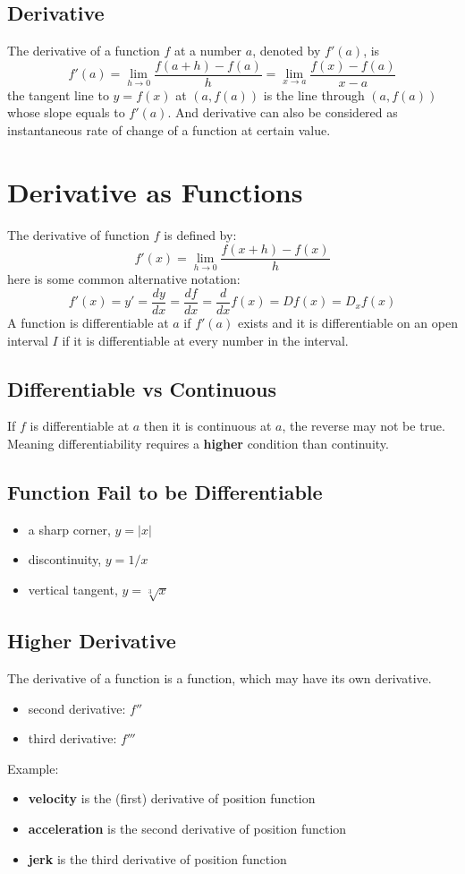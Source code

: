 \documentclass[10pt,a4paper,oneside]{article}
\begin{document}
\subsection{Derivative}
The derivative of a function $f$ at a number $a$, denoted by $f'(a)$, is
\[
f'(a) = \lim_{h \rightarrow 0} \frac{f(a+h) - f(a)}{h} = \lim_{x \rightarrow a} \frac{f(x)-f(a)}{x-a}
\]
the tangent line to $y=f(x)$ at $(a, f(a))$ is the line through $(a, f(a))$ whose slope equals to $f'(a)$. And derivative can also be considered as instantaneous rate of change of a function at certain value.

\section{Derivative as Functions}
The derivative of function $f$ is defined by:
\[
f'(x) = \lim_{h \rightarrow 0} \frac{f(x+h) - f(x)}{h}
\] 
here is some common alternative notation:
\[
f'(x) = y' = \frac{dy}{dx} = \frac{df}{dx} = \frac{d}{dx}f(x) = D f(x) = D_x f(x)
\]
A function is differentiable at $a$ if $f'(a)$ exists and it is differentiable on an open interval $I$ if it is differentiable at every number in the interval.

\subsection{Differentiable vs Continuous}
If $f$ is differentiable at $a$ then it is continuous at $a$, the reverse may not be true. Meaning differentiability requires a \textbf{higher} condition than continuity.

\subsection{Function Fail to be Differentiable}
\begin{itemize}
	\item a sharp corner, $y = |x|$
	\item discontinuity, $y = 1/x$
	\item vertical tangent, $y = \sqrt[3]{x}$
\end{itemize}

\subsection{Higher Derivative}
The derivative of a function is a function, which may have its own derivative.
\begin{itemize}
	\item second derivative: $f''$
	\item third derivative: $f'''$ 
\end{itemize}
Example:
\begin{itemize}
	\item \textbf{velocity} is the (first) derivative of position function
	\item \textbf{acceleration} is the second derivative of position function
	\item \textbf{jerk} is the third derivative of position function
\end{itemize}
\end{document}
